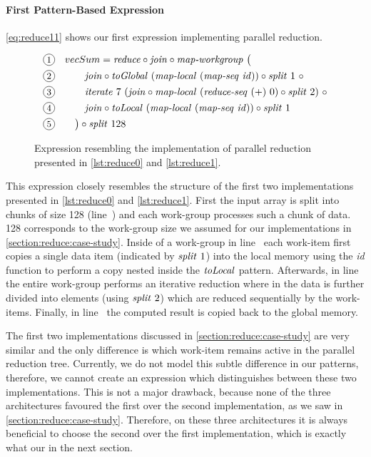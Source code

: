 \paragraph{First Pattern-Based Expression}
\autoref{eq:reduce11} shows our first expression implementing parallel reduction.
\begin{figure}
  \begin{align*}
    \lineNum{1}&
      \quad vecSum = \reduce \circ \join \circ \mapWorkgroup\ \big(\\
    \lineNum{2}&
      \qquad\quad \join \circ \toGlobal\ (\mapLocal\ (\mapSeq\ \id)) \circ \splitN\ 1\ \circ\\
    \lineNum{3}&
      \qquad\quad\iterateN\ 7\ (\join \circ \mapLocal\ (\reduceSeq\ (+)\ 0) \circ \splitN\ 2)\ \circ\\
    \lineNum{4}&
      \qquad\quad \join \circ \toLocal\ (\mapLocal\ (\mapSeq\ \id)) \circ \splitN\ 1\\
    \lineNum{5}&
      \qquad\big) \circ \splitN\ 128
  \end{align*}
  \caption{Expression resembling the implementation of parallel reduction presented in \autoref{lst:reduce0} and \autoref{lst:reduce1}.}
  \label{eq:reduce11}
\end{figure}
%
This expression closely resembles the structure of the first two implementations presented in \autoref{lst:reduce0} and \autoref{lst:reduce1}.
First the input array is split into chunks of size 128 (line~) and each work-group processes such a chunk of data.
128 corresponds to the work-group size we assumed for our implementations in \autoref{section:reduce:case-study}.
Inside of a work-group in line~ each work-item first copies a single data item (indicated by $\text{\textit{split}}\ 1$) into the local memory using the \textit{id} function to perform a copy nested inside the $\text{\textit{toLocal}}$ pattern.
Afterwards, in line~ the entire work-group performs an iterative reduction where in  the data is further divided into  elements (using $\text{\textit{split}}\ 2$) which are reduced sequentially by the work-items.
Finally, in line~ the computed result is copied back to the global memory.

The first two implementations discussed in \autoref{section:reduce:case-study} are very similar and the only difference is which work-item remains active in the parallel reduction tree.
Currently, we do not model this subtle difference in our patterns, therefore, we cannot create an expression which distinguishes between these two implementations.
This is not a major drawback, because none of the three architectures favoured the first over the second implementation, as we saw in \autoref{section:reduce:case-study}.
Therefore, on these three architectures it is always beneficial to choose the second over the first implementation, which is exactly what our  in the next section.


